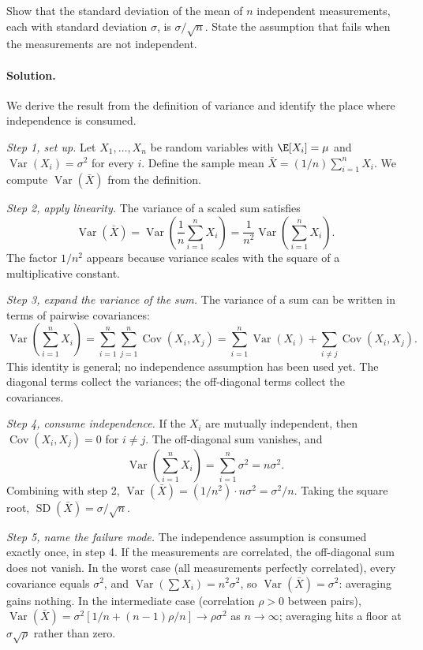 \begin{exercise}
Show that the standard deviation of the mean of $n$ independent
measurements, each with standard deviation $\sigma$, is
$\sigma / \sqrt{n}$. State the assumption that fails when the
measurements are not independent.

\paragraph{Solution.}
We derive the result from the definition of variance and identify the
place where independence is consumed.

\textit{Step 1, set up.} Let $X_{1}, \ldots, X_{n}$ be random variables
with $\E[X_{i}] = \mu$ and $\operatorname{Var}(X_{i}) = \sigma^{2}$
for every $i$. Define the sample mean
$\bar{X} = (1/n) \sum_{i=1}^{n} X_{i}$. We compute
$\operatorname{Var}(\bar{X})$ from the definition.

\textit{Step 2, apply linearity.} The variance of a scaled sum
satisfies
\[
\operatorname{Var}(\bar{X})
= \operatorname{Var}\!\left( \frac{1}{n} \sum_{i=1}^{n} X_{i} \right)
= \frac{1}{n^{2}} \operatorname{Var}\!\left( \sum_{i=1}^{n} X_{i}
\right).
\]
The factor $1/n^{2}$ appears because variance scales with the square
of a multiplicative constant.

\textit{Step 3, expand the variance of the sum.} The variance of a
sum can be written in terms of pairwise covariances:
\[
\operatorname{Var}\!\left( \sum_{i=1}^{n} X_{i} \right)
= \sum_{i=1}^{n} \sum_{j=1}^{n} \operatorname{Cov}(X_{i}, X_{j})
= \sum_{i=1}^{n} \operatorname{Var}(X_{i})
+ \sum_{i \ne j} \operatorname{Cov}(X_{i}, X_{j}).
\]
This identity is general; no independence assumption has been used
yet. The diagonal terms collect the variances; the off-diagonal terms
collect the covariances.

\textit{Step 4, consume independence.} If the $X_{i}$ are mutually
independent, then $\operatorname{Cov}(X_{i}, X_{j}) = 0$ for $i \ne
j$. The off-diagonal sum vanishes, and
\[
\operatorname{Var}\!\left( \sum_{i=1}^{n} X_{i} \right)
= \sum_{i=1}^{n} \sigma^{2}
= n \sigma^{2}.
\]
Combining with step 2,
$\operatorname{Var}(\bar{X}) = (1/n^{2}) \cdot n \sigma^{2} =
\sigma^{2}/n$. Taking the square root,
$\operatorname{SD}(\bar{X}) = \sigma / \sqrt{n}$.

\textit{Step 5, name the failure mode.} The independence assumption is
consumed exactly once, in step 4. If the measurements are correlated,
the off-diagonal sum does not vanish. In the worst case (all
measurements perfectly correlated), every covariance equals
$\sigma^{2}$, and
$\operatorname{Var}(\sum X_{i}) = n^{2} \sigma^{2}$, so
$\operatorname{Var}(\bar{X}) = \sigma^{2}$: averaging gains nothing.
In the intermediate case (correlation $\rho > 0$ between pairs),
$\operatorname{Var}(\bar{X}) = \sigma^{2} [1/n + (n-1)\rho/n]
\to \rho \sigma^{2}$ as $n \to \infty$; averaging hits a floor at
$\sigma \sqrt{\rho}$ rather than zero.


\end{exercise}
